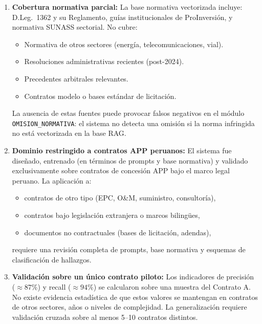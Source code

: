 \begin{enumerate}

    \item \textbf{Cobertura normativa parcial:}
    La base normativa vectorizada incluye: D.Leg.\ 1362 y su Reglamento,
    guías institucionales de ProInversión, y normativa SUNASS sectorial.
    No cubre:
    \begin{itemize}
        \item Normativa de otros sectores (energía, telecomunicaciones, vial).
        \item Resoluciones administrativas recientes (post-2024).
        \item Precedentes arbitrales relevantes.
        \item Contratos modelo o bases estándar de licitación.
    \end{itemize}
    La ausencia de estas fuentes puede provocar falsos negativos en el
    módulo \texttt{OMISION\_NORMATIVA}: el sistema no detecta una omisión
    si la norma infringida no está vectorizada en la base RAG.

    \item \textbf{Dominio restringido a contratos APP peruanos:}
    El sistema fue diseñado, entrenado (en términos de prompts y base
    normativa) y validado exclusivamente sobre contratos de concesión APP
    bajo el marco legal peruano. La aplicación a:
    \begin{itemize}
        \item contratos de otro tipo (EPC, O\&M, suministro, consultoría),
        \item contratos bajo legislación extranjera o marcos bilingües,
        \item documentos no contractuales (bases de licitación, adendas),
    \end{itemize}
    requiere una revisión completa de prompts, base normativa y esquemas
    de clasificación de hallazgos.

    \item \textbf{Validación sobre un único contrato piloto:}
    Los indicadores de precisión ($\approx 87\%$) y recall ($\approx 94\%$)
    se calcularon sobre una muestra del Contrato A. No existe
    evidencia estadística de que estos valores se mantengan en contratos
    de otros sectores, años o niveles de complejidad. La generalización
    requiere validación cruzada sobre al menos 5--10 contratos distintos.

\end{enumerate}

